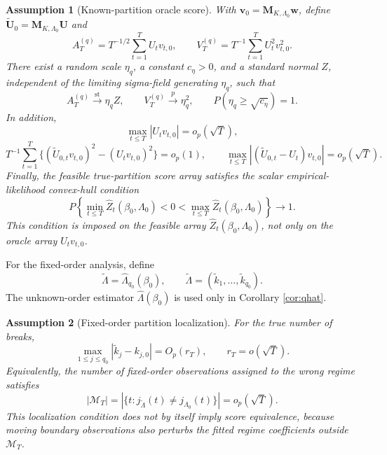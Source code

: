 \documentclass[12pt]{article}
\numberwithin{equation}{section}
\newtheorem{assumption}{Assumption}
\theoremstyle{definition}
\begin{document}
\begin{assumption}[Known-partition oracle score]
\label{ass:oracle}
With \(\bm v_0=\bm M_{K,\Lambda_0}\bm w\), define \(\widetilde{\bm U}_0=\bm M_{K,\Lambda_0}\bm U\) and
\[
    A_T^{(q)}
    =
    T^{-1/2}\sum_{t=1}^T U_tv_{t,0},
    \qquad
    V_T^{(q)}
    =
    T^{-1}\sum_{t=1}^T U_t^2v_{t,0}^2.
\]
There exist a random scale \(\eta_q\), a constant \(c_\eta>0\), and a standard normal \(Z\), independent of the limiting sigma-field generating \(\eta_q\), such that
\[
    A_T^{(q)}\xrightarrow{\mathrm{st}}\eta_qZ,
    \qquad
    V_T^{(q)}\xrightarrow{p}\eta_q^2,
    \qquad
    P(\eta_q\geq\sqrt{c_\eta})=1.
\]
In addition,
\[
    \max_{t\leq T}|U_tv_{t,0}|=o_p(\sqrt T),
\]
\[
    T^{-1}\sum_{t=1}^T
    \{(\widetilde U_{0,t}v_{t,0})^2-(U_tv_{t,0})^2\}
    =o_p(1),
    \qquad
    \max_{t\leq T}|(\widetilde U_{0,t}-U_t)v_{t,0}|
    =o_p(\sqrt T).
\]
Finally, the feasible true-partition score array satisfies the scalar empirical-likelihood convex-hull condition
\[
    P\left\{
    \min_{t\leq T}\widehat Z_t(\beta_0,\Lambda_0)<0<
    \max_{t\leq T}\widehat Z_t(\beta_0,\Lambda_0)
    \right\}\to1.
\]
This condition is imposed on the feasible array \(\widehat Z_t(\beta_0,\Lambda_0)\), not only on the oracle array \(U_tv_{t,0}\).
\end{assumption}

For the fixed-order analysis, define
\[
    \widetilde\Lambda
    =
    \widehat\Lambda_{q_0}(\beta_0),
    \qquad
    \widetilde\Lambda=(\widetilde k_1,\ldots,\widetilde k_{q_0}).
\]
The unknown-order estimator \(\widehat\Lambda(\beta_0)\) is used only in Corollary \ref{cor:qhat}.

\begin{assumption}[Fixed-order partition localization]
\label{ass:partition-localization}
For the true number of breaks,
\[
    \max_{1\leq j\leq q_0}
    |\widetilde k_j-k_{j,0}|
    =
    O_p(r_T),
    \qquad
    r_T=o(\sqrt T).
\]
Equivalently, the number of fixed-order observations assigned to the wrong regime satisfies
\[
    |\mathcal M_T|
    =
    \left|
    \{t:j_{\widetilde\Lambda}(t)\neq j_{\Lambda_0}(t)\}
    \right|
    =
    o_p(\sqrt T).
\]
This localization condition does not by itself imply score equivalence, because moving boundary observations also perturbs the fitted regime coefficients outside \(\mathcal M_T\).
\end{assumption}
\end{document}
